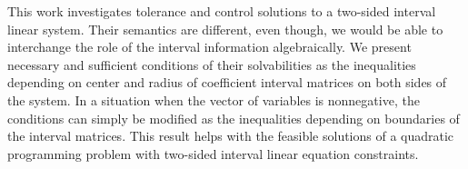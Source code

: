 
This work investigates tolerance and control solutions to a two-sided interval linear system. Their semantics are different, even though, we would be able to interchange the role of the interval information algebraically. We present   necessary and sufficient conditions of their solvabilities as the inequalities depending on center and radius of coefficient interval matrices on both sides of the system. In a situation when the vector of variables is nonnegative, the conditions can simply be modified as the inequalities depending on boundaries of the interval matrices. This result helps with the feasible solutions of a quadratic programming problem with two-sided interval linear equation constraints. 




